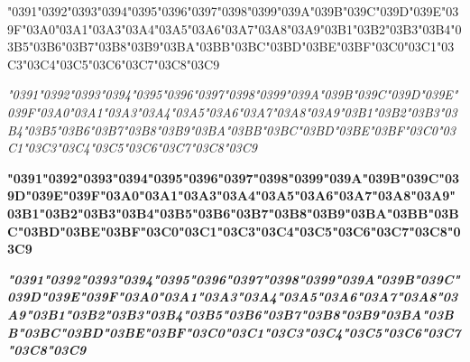 {\LibertinusSerifPatch
	\char"0391\gs \char"0392\gs \char"0393\gs \char"0394\gs \char"0395\gs \char"0396\gs \char"0397\gs \char"0398\gs \char"0399\gs \char"039A\gs \char"039B\gs \char"039C\gs \char"039D\gs \char"039E\gs \char"039F\gs \char"03A0\gs \char"03A1\gs \char"03A3\gs \char"03A4\gs \char"03A5\gs \char"03A6\gs \char"03A7\gs \char"03A8\gs \char"03A9\gs \char"03B1\gs \char"03B2\gs \char"03B3\gs \char"03B4\gs \char"03B5\gs \char"03B6\gs \char"03B7\gs \char"03B8\gs \char"03B9\gs \char"03BA\gs \char"03BB\gs \char"03BC\gs \char"03BD\gs \char"03BE\gs \char"03BF\gs \char"03C0\gs \char"03C1\gs \char"03C3\gs \char"03C4\gs \char"03C5\gs \char"03C6\gs \char"03C7\gs \char"03C8\gs \char"03C9\gs
}

{\LibertinusSerifPatch\itshape 
	\char"0391\gs \char"0392\gs \char"0393\gs \char"0394\gs \char"0395\gs \char"0396\gs \char"0397\gs \char"0398\gs \char"0399\gs \char"039A\gs \char"039B\gs \char"039C\gs \char"039D\gs \char"039E\gs \char"039F\gs \char"03A0\gs \char"03A1\gs \char"03A3\gs \char"03A4\gs \char"03A5\gs \char"03A6\gs \char"03A7\gs \char"03A8\gs \char"03A9\gs \char"03B1\gs \char"03B2\gs \char"03B3\gs \char"03B4\gs \char"03B5\gs \char"03B6\gs \char"03B7\gs \char"03B8\gs \char"03B9\gs \char"03BA\gs \char"03BB\gs \char"03BC\gs \char"03BD\gs \char"03BE\gs \char"03BF\gs \char"03C0\gs \char"03C1\gs \char"03C3\gs \char"03C4\gs \char"03C5\gs \char"03C6\gs \char"03C7\gs \char"03C8\gs \char"03C9\gs
}

{\LibertinusSerifPatch\bfseries 
	\char"0391\gs \char"0392\gs \char"0393\gs \char"0394\gs \char"0395\gs \char"0396\gs \char"0397\gs \char"0398\gs \char"0399\gs \char"039A\gs \char"039B\gs \char"039C\gs \char"039D\gs \char"039E\gs \char"039F\gs \char"03A0\gs \char"03A1\gs \char"03A3\gs \char"03A4\gs \char"03A5\gs \char"03A6\gs \char"03A7\gs \char"03A8\gs \char"03A9\gs \char"03B1\gs \char"03B2\gs \char"03B3\gs \char"03B4\gs \char"03B5\gs \char"03B6\gs \char"03B7\gs \char"03B8\gs \char"03B9\gs \char"03BA\gs \char"03BB\gs \char"03BC\gs \char"03BD\gs \char"03BE\gs \char"03BF\gs \char"03C0\gs \char"03C1\gs \char"03C3\gs \char"03C4\gs \char"03C5\gs \char"03C6\gs \char"03C7\gs \char"03C8\gs \char"03C9\gs
}

{\LibertinusSerifPatch\itshape\bfseries 
	\char"0391\gs \char"0392\gs \char"0393\gs \char"0394\gs \char"0395\gs \char"0396\gs \char"0397\gs \char"0398\gs \char"0399\gs \char"039A\gs \char"039B\gs \char"039C\gs \char"039D\gs \char"039E\gs \char"039F\gs \char"03A0\gs \char"03A1\gs \char"03A3\gs \char"03A4\gs \char"03A5\gs \char"03A6\gs \char"03A7\gs \char"03A8\gs \char"03A9\gs \char"03B1\gs \char"03B2\gs \char"03B3\gs \char"03B4\gs \char"03B5\gs \char"03B6\gs \char"03B7\gs \char"03B8\gs \char"03B9\gs \char"03BA\gs \char"03BB\gs \char"03BC\gs \char"03BD\gs \char"03BE\gs \char"03BF\gs \char"03C0\gs \char"03C1\gs \char"03C3\gs \char"03C4\gs \char"03C5\gs \char"03C6\gs \char"03C7\gs \char"03C8\gs \char"03C9\gs
}
